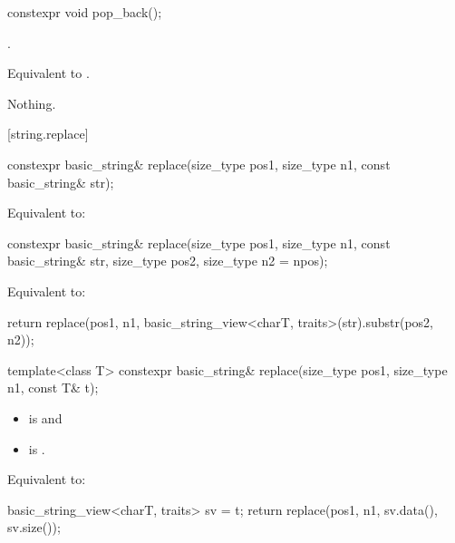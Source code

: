 %
\begin{itemdecl}
constexpr void pop_back();
\end{itemdecl}

\begin{itemdescr}
\pnum
\expects
{}.

\pnum
\effects
Equivalent to .

\pnum
\throws
Nothing.
\end{itemdescr}

[string.replace]{}

%
\begin{itemdecl}
constexpr basic_string& replace(size_type pos1, size_type n1, const basic_string& str);
\end{itemdecl}

\begin{itemdescr}
\pnum
\effects
Equivalent to: 
\end{itemdescr}

%
\begin{itemdecl}
constexpr basic_string& replace(size_type pos1, size_type n1, const basic_string& str,
                                size_type pos2, size_type n2 = npos);
\end{itemdecl}

\begin{itemdescr}
\pnum
\effects
Equivalent to:
\begin{codeblock}
return replace(pos1, n1, basic_string_view<charT, traits>(str).substr(pos2, n2));
\end{codeblock}
\end{itemdescr}

%
\begin{itemdecl}
template<class T>
  constexpr basic_string& replace(size_type pos1, size_type n1, const T& t);
\end{itemdecl}

\begin{itemdescr}
\pnum
\constraints
\begin{itemize}
\item
{} is
 and
\item
{} is
.
\end{itemize}

\pnum
\effects
Equivalent to:
\begin{codeblock}
basic_string_view<charT, traits> sv = t;
return replace(pos1, n1, sv.data(), sv.size());
\end{codeblock}
\end{itemdescr}

